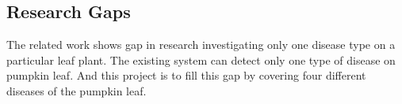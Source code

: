 \subsection{Research Gaps} \sectionTitleBody


The related work shows gap in research investigating only one disease type on a particular leaf plant. The existing system can detect only one type of disease on pumpkin leaf. And this project is to fill this gap by covering four different diseases of the pumpkin leaf.






